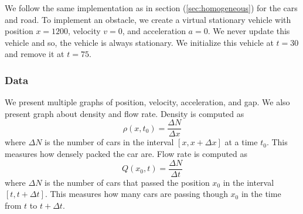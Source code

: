 \documentclass[12pt]{article}
\begin{document}
    We follow the same implementation as in section (\ref{sec:homogeneous}) for the cars and road. To implement an obstacle, we create a virtual stationary vehicle with position $x=1200$, velocity $v=0$, and acceleration $a=0$. We never update this vehicle and so, the vehicle is always stationary. We initialize this vehicle at $t=30$ and remove it at $t=75$. 
    \subsubsection{Data}
    We present multiple graphs of position, velocity, acceleration, and gap. We also present graph about density and flow rate. Density is computed as 
    \begin{equation} 
      \rho(x,t_0) = \frac{\Delta N}{\Delta x}
    \end{equation}
    where $\Delta N$ is the number of cars  in the interval $[x, x+\Delta x]$ at a time $t_0$. This measures how densely packed the car are. Flow rate is computed as 
    \begin{equation} 
      Q(x_0,t) = \frac{\Delta N}{\Delta t}
    \end{equation}
    where $\Delta N$ is the number of cars that passed the position $x_0$ in the interval $[t, t +\Delta t]$. This measures how many cars are passing though $x_0$ in the time from $t$ to $t + \Delta t$. 
\end{document}
